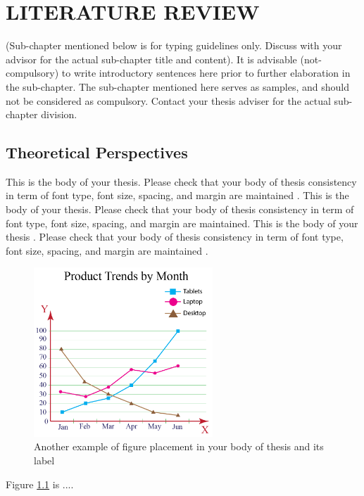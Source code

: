 
\chapter{LITERATURE REVIEW}
\label{chap:literature-review}
\thispagestyle{fancy}
(Sub-chapter mentioned below is for typing guidelines only. Discuss with your advisor for the actual sub-chapter title and content). It is advisable (not-compulsory) to write introductory sentences here prior to further elaboration in the sub-chapter. The sub-chapter mentioned here serves as samples, and should not be considered as compulsory. Contact your thesis adviser for the actual sub-chapter division.
	 
\section{Theoretical Perspectives}
\label{sec:theoretical-perspective}
This is the body of your thesis. Please check that your body of thesis consistency in term of font type, font size, spacing, and margin are maintained \cite{gdbusecaseneo4j}. This is the body of your thesis. Please check that your body of thesis consistency in term of font type, font size, spacing, and margin are maintained. This is the body of your thesis \cite{linuxstatistic}. Please check that your body of thesis consistency in term of font type, font size, spacing, and margin are maintained \cite{shin2022focusing}.

\begin{figure}[htbp]
	\centering 
	\includegraphics[width=0.6\textwidth]{images/graph.png}
	\caption{Another example of figure placement in your body of thesis and its label}
	\label{fig:figure-example}
\end{figure} 
 
Figure \ref{fig:figure-example} is ....

